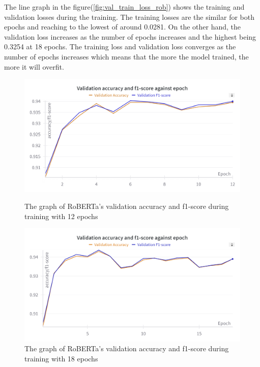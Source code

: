 The line graph in the figure(\ref{fig:val_train_loss_rob}) shows the training and validation losses during the training. The training losses are the similar for both epochs and reaching to the lowest of around 0.0281. On the other hand, the validation loss increases as the number of epochs increases and the highest being 0.3254 at 18 epochs. The training loss and validation loss converges as the number of epochs increases which means that the more the model trained, the more it will overfit.

\begin{figure}[h!]
    \centering
    \begin{minipage}{.5\textwidth}
        \centering
        \includegraphics[width=1\linewidth]{Figures/val_ac_f1_12_rob.png}
        \caption{The graph of RoBERTa's validation accuracy and f1-score during training with 12 epochs}
        \label{fig:RoBERTa_acc_f1_12}
    \end{minipage}%
    \begin{minipage}{.5\textwidth}
        \centering
        \includegraphics[width=1\linewidth]{Figures/val_ac_f1_18_rob.png}
        \caption{The graph of RoBERTa's validation accuracy and f1-score during training with 18 epochs}
        \label{fig:RoBERTa_acc_f1_18}
    \end{minipage}
\end{figure}

